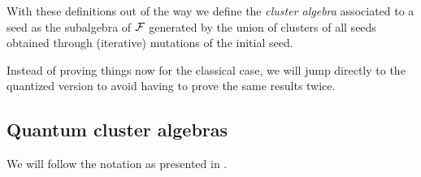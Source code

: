 \documentclass{article}
\begin{document}
\medskip

With these definitions out of the way we define the \emph{cluster algebra} associated to a seed
as the subalgebra of $\mathcal{F}$ generated by the union of clusters of all seeds
obtained through (iterative) mutations of the initial seed.

Instead of proving things now for the classical case,
we will jump directly to the quantized version to
avoid having to prove the same results twice.

\subsection{Quantum cluster algebras}

We will follow the notation as presented in \cite{GoodearlYakimov2017QCA}.



\end{document}

